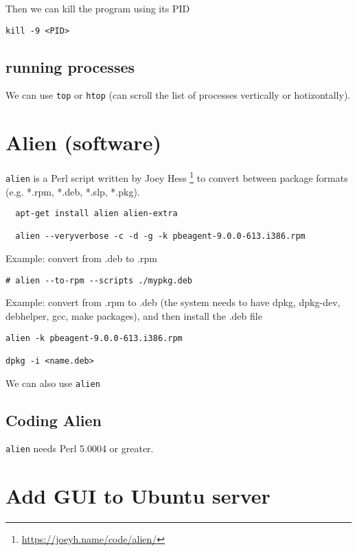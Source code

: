 Then we can kill the program using its PID
\begin{verbatim}
kill -9 <PID>
\end{verbatim}


\subsection{running processes}

We can use \verb!top! or \verb!htop! (can scroll the list of processes
vertically or hotizontally).




\section{Alien (software)}
\label{sec:alien}

\verb!alien! is a Perl script written by Joey Hess
\footnote{\url{https://joeyh.name/code/alien/}} to convert between package
formats (e.g. *.rpm, *.deb, *.slp, *.pkg).
\begin{verbatim}
  apt-get install alien alien-extra
  
  alien --veryverbose -c -d -g -k pbeagent-9.0.0-613.i386.rpm
\end{verbatim}

Example: convert from .deb to .rpm
\begin{verbatim}
# alien --to-rpm --scripts ./mypkg.deb
\end{verbatim}

Example: convert from .rpm to .deb (the system needs to have dpkg, dpkg-dev,
debhelper, gcc, make packages), and then install the .deb file
\begin{verbatim}
alien -k pbeagent-9.0.0-613.i386.rpm

dpkg -i <name.deb> 
\end{verbatim}

We can also use \verb!alien!

\subsection{Coding Alien}

\verb!alien! needs Perl 5.0004 or greater. 

\section{Add GUI to Ubuntu server}


